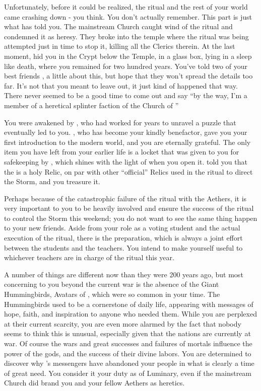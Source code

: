 \documentclass[char]{GL2020}
\begin{document}
Unfortunately, before it could be realized, the ritual and the rest of your world came crashing down - you think. You don't actually remember. This part is just what \cWildCard{} has told you. The mainstream Church caught wind of the ritual and condemned it as heresy. They broke into the temple where the ritual was being attempted just in time to stop it, killing all the Clerics therein. At the last moment, \cDisneyMentor{} hid you in the Crypt below the Temple, in a glass box, lying in a sleep like death, where you remained for two hundred years. You've told two of your best friends \cPirateChild{}, \cTechStar{} a little about this, but hope that they won't spread the details too far. It's not that you meant to leave \cAdopted{} out, it just kind of happened that way. There never seemed to be a good time to come out and say ``by the way, I'm a member of a heretical splinter faction of the Church of \cFarmGod{}''

You were awakened by \cWildCard{}, who had worked for years to unravel a puzzle that eventually led \cWildCard{\them} to you. \cWildCard{}, who has become your kindly benefactor, gave you your first introduction to the modern world, and you are eternally grateful. The only item you have left from your earlier life is a locket that was given to you for safekeeping by \cDisneyMentor{}, which shines with the light of \cFarmGod{} when you open it. \cDisneyMentor{} told you that the \iLocket{} is a holy Relic, on par with other ``official'' Relics used in the ritual to direct the Storm, and you treasure it. 

Perhaps because of the catastrophic failure of the ritual with the Aethers, it is very important to you to be heavily involved and ensure the success of the ritual to control the Storm this weekend; you do not want to see the same thing happen to your new friends. Aside from your role as a voting student and the actual execution of the ritual, there is the preparation, which is always a joint effort between the students and the teachers. You intend to make yourself useful to whichever teachers are in charge of the ritual this year. 

A number of things are different now than they were 200 years ago, but most concerning to you beyond the current war is the absence of the Giant Hummingbirds, Avatars of \cFarmGod{}, which were so common in your time. The Hummingbirds used to be a cornerstone of daily life, appearing with messages of hope, faith, and inspiration to anyone who needed them. While you are perplexed at their current scarcity, you are even more alarmed by the fact that nobody seems to think this is unusual, especially given that the nations are currently at war. Of course the wars and great successes and failures of mortals influence the power of the gods, and the success of their divine labors. You are determined to discover why \cFarmGod{}'s messengers have abandoned your people in what is clearly a time of great need. You consider it your duty as \cDisney{\cleric} of Luminary, even if the mainstream Church did brand you and your fellow Aethers as heretics. 
\end{document}
